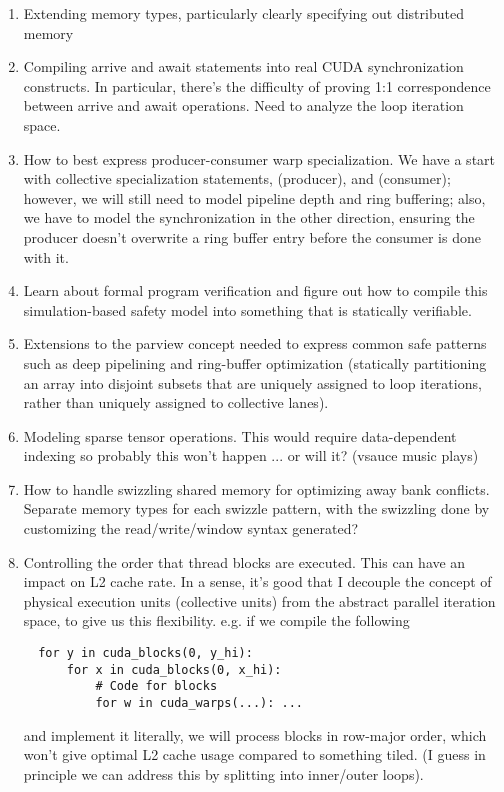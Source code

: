 \begin{enumerate}
  \item Extending memory types, particularly clearly specifying out distributed memory
  \filbreak
  \item Compiling arrive and await statements into real CUDA synchronization constructs.
    In particular, there's the difficulty of proving 1:1 correspondence between arrive and await operations.
    Need to analyze the loop iteration space.
  \filbreak
  \item How to best express producer-consumer warp specialization.
    We have a start with collective specialization statements,  (producer), and  (consumer); however, we will still need to model pipeline depth and ring buffering; also, we have to model the synchronization in the other direction, ensuring the producer doesn't overwrite a ring buffer entry before the consumer is done with it.
  \filbreak
  \item Learn about formal program verification and figure out how to compile this simulation-based safety model into something that is statically verifiable.
  \filbreak
  \item Extensions to the parview concept needed to express common safe patterns such as deep pipelining and ring-buffer optimization (statically partitioning an array into disjoint subsets that are uniquely assigned to loop iterations, rather than uniquely assigned to collective lanes).
  \filbreak
  \item Modeling sparse tensor operations. This would require data-dependent indexing so probably this won't happen ... or will it? (vsauce music plays)
  \filbreak
  \item How to handle swizzling shared memory for optimizing away bank conflicts.
    Separate memory types for each swizzle pattern, with the swizzling done by customizing the read/write/window syntax generated?
  \filbreak
  \item Controlling the order that thread blocks are executed.
  This can have an impact on L2 cache rate.
  In a sense, it's good that I decouple the concept of physical execution units (collective units) from the abstract parallel iteration space, to give us this flexibility. e.g. if we compile the following
  \filbreak
{
\color{lightttColor}
\begin{verbatim}
  for y in cuda_blocks(0, y_hi):
      for x in cuda_blocks(0, x_hi):
          # Code for blocks
          for w in cuda_warps(...): ...
\end{verbatim}
}
  \filbreak
  and implement it literally, we will process blocks in row-major order, which won't give optimal L2 cache usage compared to something tiled.
  (I guess in principle we can address this by splitting into inner/outer loops).
\end{enumerate}

